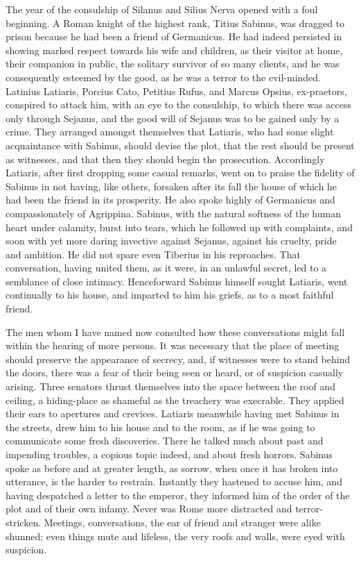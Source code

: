 The year of the consulship of Silanus and Silius Nerva opened with a foul beginning. A Roman knight of the highest rank, Titius Sabinus, was dragged to prison because he had been a friend of Germanicus. He had indeed persisted in showing marked respect towards his wife and children, as their visitor at home, their companion in public, the solitary survivor of so many clients, and he was consequently esteemed by the good, as he was a terror to the evil-minded. Latinius Latiaris, Porcius Cato, Petitius Rufus, and Marcus Opsius, ex-praetors, conspired to attack him, with an eye to the consulship, to which there was access only through Sejanus, and the good will of Sejanus was to be gained only by a crime. They arranged amongst themselves that Latiaris, who had some slight acquaintance with Sabinus, should devise the plot, that the rest should be present as witnesses, and that then they should begin the prosecution. Accordingly Latiaris, after first dropping some casual remarks, went on to praise the fidelity of Sabinus in not having, like others, forsaken after its fall the house of which he had been the friend in its prosperity. He also spoke highly of Germanicus and compassionately of Agrippina. Sabinus, with the natural softness of the human heart under calamity, burst into tears, which he followed up with complaints, and soon with yet more daring invective against Sejanus, against his cruelty, pride and ambition. He did not spare even Tiberius in his reproaches. That conversation, having united them, as it were, in an unlawful secret, led to a semblance of close intimacy. Henceforward Sabinus himself sought Latiaris, went continually to his house, and imparted to him his griefs, as to a most faithful friend.


The men whom I have named now consulted how these conversations might fall within the hearing of more persons. It was necessary that the place of meeting should preserve the appearance of secrecy, and, if witnesses were to stand behind the doors, there was a fear of their being seen or heard, or of suspicion casually arising. Three senators thrust themselves into the space between the roof and ceiling, a hiding-place as shameful as the treachery was execrable. They applied their ears to apertures and crevices. Latiaris meanwhile having met Sabinus in the streets, drew him to his house and to the room, as if he was going to communicate some fresh discoveries. There he talked much about past and impending troubles, a copious topic indeed, and about fresh horrors. Sabinus spoke as before and at greater length, as sorrow, when once it has broken into utterance, is the harder to restrain. Instantly they hastened to accuse him, and having despatched a letter to the emperor, they informed him of the order of the plot and of their own infamy. Never was Rome more distracted and terror-stricken. Meetings, conversations, the ear of friend and stranger were alike shunned; even things mute and lifeless, the very roofs and walls, were eyed with suspicion.

